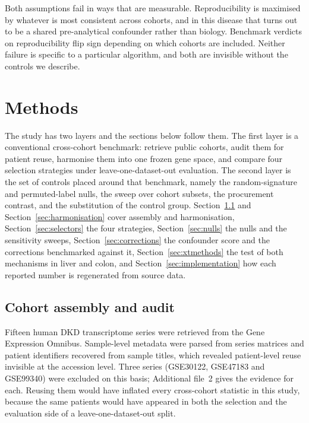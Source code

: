 \documentclass[pdflatex,sn-vancouver-num]{sn-jnl}
\theoremstyle{thmstyleone}
\theoremstyle{thmstyletwo}
\theoremstyle{thmstylethree}
\begin{document}
Both assumptions fail in ways that are measurable. Reproducibility is maximised by whatever is
most consistent across cohorts, and in this disease that turns out to be a shared pre-analytical
confounder rather than biology. Benchmark verdicts on reproducibility flip sign depending on
which cohorts are included. Neither failure is specific to a particular algorithm, and both are
invisible without the controls we describe.

\section{Methods}\label{sec:methods}

The study has two layers and the sections below follow them. The first layer is a conventional
cross-cohort benchmark: retrieve public cohorts, audit them for patient reuse, harmonise them
into one frozen gene space, and compare four selection strategies under leave-one-dataset-out
evaluation. The second layer is the set of controls placed around that benchmark, namely the
random-signature and permuted-label nulls, the sweep over cohort subsets, the procurement
contrast, and the substitution of the control group. Section~\ref{sec:cohorts} and
Section~\ref{sec:harmonisation} cover assembly and harmonisation, Section~\ref{sec:selectors}
the four strategies, Section~\ref{sec:nulls} the nulls and the sensitivity sweeps,
Section~\ref{sec:corrections} the confounder score and the corrections benchmarked against it,
Section~\ref{sec:xtmethods} the test of both mechanisms in liver and colon,
and Section~\ref{sec:implementation} how each reported number is regenerated from source data.

\subsection{Cohort assembly and audit}\label{sec:cohorts}

Fifteen human DKD transcriptome series were retrieved from the Gene Expression Omnibus.
Sample-level metadata were parsed from series matrices and patient identifiers recovered from
sample titles, which revealed patient-level reuse invisible at the accession level. Three series
(GSE30122, GSE47183 and GSE99340) were excluded on this basis; Additional file~2 gives the evidence for each. Reusing them would have
inflated every cross-cohort statistic in this study, because the same patients would have
appeared in both the selection and the evaluation side of a leave-one-dataset-out split.
\end{document}
